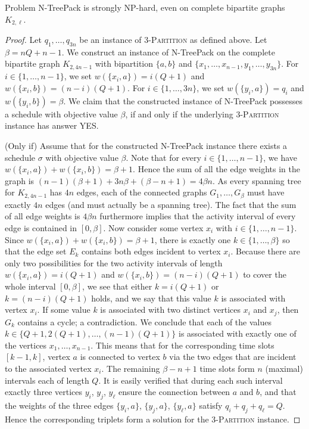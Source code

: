 \documentclass[runningheads]{llncs}
\newcommand{\set}[1]{\{ #1 \}}
\newcommand{\fromto}[2]{\set{#1, \ldots, #2}}
\newcommand{\xxxNTP}{{\sc N-TreePack}}
\newcommand{\lasse}[1]{#1}
\begin{document}
\begin{theorem}
\label{thm:hardness_complete_bipartite}
Problem {\xxxNTP} is strongly NP-hard, even on complete bipartite graphs $K_{2,\ell}$. 
\end{theorem}
\begin{proof}
Let $q_1,\ldots,q_{3n}$ be an instance of \textsc{3-Partition} as defined above. 
Let $\beta= nQ + n - 1$. 
We construct an instance of {\xxxNTP} on the complete bipartite graph $K_{2,4n-1}$ with bipartition
$\set{a,b}$ and $\set{x_1, \ldots, x_{n-1}, y_1, \ldots, y_{3n}}$. 
For $i\in\{1,\ldots,n-1\}$, we set $w(\set{x_i,a})= i(Q + 1)$ and $w(\set{x_i,b})= (n-i)(Q+1)$. 
For $i\in\{1,\ldots,3n\}$,  we set $w(\set{y_i,a})= q_i$      and $w(\set{y_i,b})= \beta$. 
We claim that the constructed instance of {\xxxNTP} possesses a schedule with objective value $\beta$, 
if and only if the underlying \textsc{3-Partition} instance has answer YES.

(Only if) Assume that for the constructed {\xxxNTP} instance there exists a schedule $\sigma$ 
with objective value $\beta$. 
Note that for every $i \in \{1,\dots,n-1\}$, we have $w(\set{x_i,a}) +w(\set{x_i,b}) = \beta+1$. 
Hence the sum of all the edge weights in the graph is $(n-1)(\beta+1) +3n\beta +(\beta-n+1) = 4\beta n$. 
As every spanning tree for $K_{2, 4n-1}$ has $4n$ edges, each of the connected graphs $G_1,\dots,G_\beta$ 
must have exactly $4n$ edges (and must actually be a spanning tree). \lasse{The fact that the sum of all edge weights is $4\beta n$ furthermore} implies that the activity interval of every edge is contained in $[0, \beta]$.
Now consider some vertex $x_i$ with $i\in\{1,\dots,n-1\}$. 
Since $w(\set{x_i,a}) + w(\set{x_i,b})=\beta+1$, there is exactly one $k\in\fromto{1}{\beta}$ so 
that the edge set $E_k$ contains both edges incident to vertex $x_i$. 
\lasse{Because there are only two possibilities for the two activity intervals of length $w(\set{x_i,a}) = i(Q+1)$ and $w(\set{x_i,b}) = (n-i)(Q+1)$ to cover the whole interval $[0, \beta]$, we see} that either $k=i(Q+1)$ or $k=(n-i)(Q+1)$ holds, and we say that this value $k$ 
is associated with vertex $x_i$.
If some value $k$ is associated with two distinct vertices $x_i$ and $x_j$, then $G_k$ contains 
a cycle; a contradiction.
We conclude that each of the values $k\in\set{Q+1,2(Q+1),\ldots,(n-1)(Q+1)}$ is associated with
exactly one of the vertices $x_1,\ldots,x_{n-1}$.
This means that for the corresponding time slots $[k-1,k]$, vertex $a$ is connected to vertex $b$
via the two edges that are incident to the associated vertex $x_i$.
The remaining $\beta-n+1$ time slots form $n$ (maximal) intervals each of length $Q$.
It is easily verified that during each such interval exactly three vertices $y_i$, $y_j$, $y_{\ell}$
ensure the connection between $a$ and $b$, and that the weights of the three edges $\{y_i,a\}$,
$\{y_j,a\}$, $\{y_{\ell},a\}$ satisfy $q_i+q_j+q_{\ell}=Q$.
Hence the corresponding triplets form a solution for the \textsc{3-Partition} instance.


\end{proof}
\end{document}
